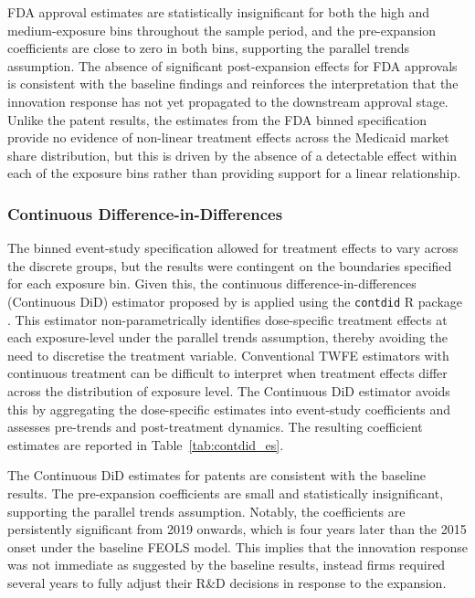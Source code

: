 \documentclass[12pt]{article}
\begin{document}
FDA approval estimates are statistically insignificant for both the high and medium-exposure bins throughout the sample period, and the pre-expansion coefficients are close to zero in both bins, supporting the parallel trends assumption. The absence of significant post-expansion effects for FDA approvals is consistent with the baseline findings and reinforces the interpretation that the innovation response has not yet propagated to the downstream approval stage. Unlike the patent results, the estimates from the FDA binned specification provide no evidence of non-linear treatment effects across the Medicaid market share distribution, but this is driven by the absence of a detectable effect within each of the exposure bins rather than providing support for a linear relationship.

\subsubsection{Continuous Difference-in-Differences}

The binned event-study specification allowed for treatment effects to vary across the discrete groups, but the results were contingent on the boundaries specified for each exposure bin. Given this, the continuous difference-in-differences (Continuous DiD) estimator proposed by \citet{NBERw32117} is applied using the \texttt{contdid} R package \citep{contdid2025}. This estimator non-parametrically identifies dose-specific treatment effects at each exposure-level under the parallel trends assumption, thereby avoiding the need to discretise the treatment variable. Conventional TWFE estimators with continuous treatment can be difficult to interpret when treatment effects differ across the distribution of exposure level. The Continuous DiD estimator avoids this by aggregating the dose-specific estimates into event-study coefficients and assesses pre-trends and post-treatment dynamics. The resulting coefficient estimates are reported in Table~\ref{tab:contdid_es}.

The Continuous DiD estimates for patents are consistent with the baseline results. The pre-expansion coefficients are small and statistically insignificant, supporting the parallel trends assumption. Notably, the coefficients are persistently significant from 2019 onwards, which is four years later than the 2015 onset under the baseline FEOLS model. This implies that the innovation response was not immediate as suggested by the baseline results, instead firms required several years to fully adjust their R\&D decisions in response to the expansion.
\end{document}
